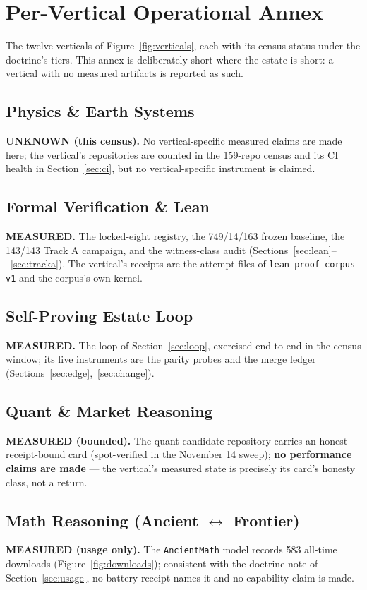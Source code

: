 ﻿\documentclass[11pt]{article}
\begin{document}
\section{Per-Vertical Operational Annex}
\label{sec:annex}

The twelve verticals of Figure~\ref{fig:verticals}, each with its census status under the doctrine's tiers. This annex is deliberately short where the estate is short: a vertical with no measured artifacts is reported as such.

\subsection{Physics \& Earth Systems}
\textbf{UNKNOWN (this census).} No vertical-specific measured claims are made here; the vertical's repositories are counted in the 159-repo census and its CI health in Section~\ref{sec:ci}, but no vertical-specific instrument is claimed.

\subsection{Formal Verification \& Lean}
\textbf{MEASURED.} The locked-eight registry, the 749/14/163 frozen baseline, the 143/143 Track A campaign, and the witness-class audit (Sections~\ref{sec:lean}--~\ref{sec:tracka}). The vertical's receipts are the attempt files of \texttt{lean-proof-corpus-v1} and the corpus's own kernel.

\subsection{Self-Proving Estate Loop}
\textbf{MEASURED.} The loop of Section~\ref{sec:loop}, exercised end-to-end in the census window; its live instruments are the parity probes and the merge ledger (Sections~\ref{sec:edge},~\ref{sec:change}).

\subsection{Quant \& Market Reasoning}
\textbf{MEASURED (bounded).} The quant candidate repository carries an honest receipt-bound card (spot-verified in the November 14 sweep); \textbf{no performance claims are made} --- the vertical's measured state is precisely its card's honesty class, not a return.

\subsection{Math Reasoning (Ancient $\leftrightarrow$ Frontier)}
\textbf{MEASURED (usage only).} The \texttt{AncientMath} model records 583 all-time downloads (Figure~\ref{fig:downloads}); consistent with the doctrine note of Section~\ref{sec:usage}, no battery receipt names it and no capability claim is made.
\end{document}
